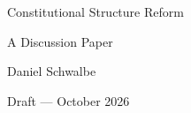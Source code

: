 \documentclass[a4paper, 12pt, numbers=noenddot, parskip=half]{scrartcl}
\begin{document}
\begin{titlepage}
  \centering
  \vspace*{6cm}
  {\LARGE Constitutional Structure Reform\par}
  \vspace{2cm}
  {\normalsize A Discussion Paper\par}
  \vspace{1cm}
  {\normalsize Daniel Schwalbe\par}
  \vspace{1cm}
  {\normalsize Draft --- October 2026\par}
  \vfill
\end{titlepage}

\tableofcontents
\newpage


\end{document}
